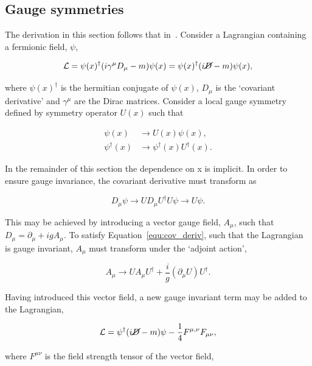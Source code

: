 \subsection{Gauge symmetries}

The derivation in this section follows that in~\cite{ewk-int}. Consider a Lagrangian containing a fermionic field, $\psi$,

\begin{equation}
\mathcal{L} = \psi(x)^{\dagger} (i\gamma^{\mu}D_{\mu} - m)\psi(x) = \psi(x)^{\dagger} (i\cancel{D} - m)\psi(x),
\end{equation}

where $\psi(x)^{\dagger}$ is the hermitian conjugate of $\psi(x)$, $D_{\mu}$ is the `covariant derivative' and
$\gamma^{\mu}$ are the Dirac matrices. Consider a local gauge symmetry defined by symmetry operator $U(x)$ such that

\begin{align}
\psi(x) &\rightarrow U(x)\psi(x), \\
\psi^{\dagger}(x) &\rightarrow \psi^{\dagger} (x) U^{\dagger} (x).
\end{align}

In the remainder of this section the dependence on x is implicit. In order to ensure gauge invariance, the 
covariant derivative must transform as 

\begin{equation}
\label{equ:cov_deriv}
D_{\mu}\psi \rightarrow U D_{\mu}U^{\dagger} U \psi \rightarrow U \psi.
\end{equation}

This may be achieved by introducing a vector gauge field, $A_\mu$, such that 
$D_{\mu} = \partial_{\mu} + igA_{\mu}$. To satisfy Equation~\ref{equ:cov_deriv},
such that the Lagrangian is gauge invariant, $A_{\mu}$ must transform
under the `adjoint action',

\begin{equation}
A_{\mu} \rightarrow U A_{\mu} U^{\dagger} + \frac{i}{g}(\partial_{\mu}U)U^{\dagger}.
\end{equation}

Having introduced this vector field, a new gauge invariant term may be added to the Lagrangian,

\begin{equation}
\mathcal{L} = \psi^{\dagger} (i\cancel{D} - m)\psi - \frac{1}{4}F^{\mu,\nu}F_{\mu\nu},
\end{equation}

where $F^{\mu\nu}$ is the field strength tensor of the vector field,

